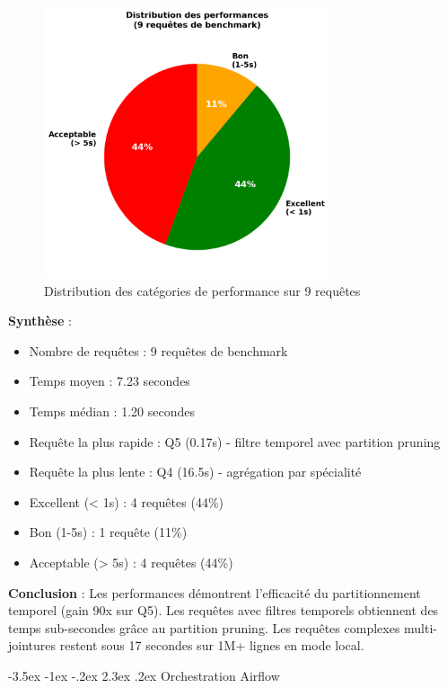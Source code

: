 \documentclass[12pt,a4paper]{article}
\makeatletter
\renewcommand\section{\@startsection{section}{1}{\z@}%
    {-3.5ex \@plus -1ex \@minus -.2ex}%
    {2.3ex \@plus.2ex}%
    {\normalfont\Large\bfseries\color{blue!70!black}}}
\makeatother
\begin{document}
\begin{figure}[H]
\centering
\includegraphics[width=0.75\textwidth]{performance_distribution.png}
\caption{Distribution des catégories de performance sur 9 requêtes}
\label{fig:perf_distribution}
\end{figure}

\textbf{Synthèse} :
\begin{itemize}
\item Nombre de requêtes : 9 requêtes de benchmark
\item Temps moyen : 7.23 secondes
\item Temps médian : 1.20 secondes
\item Requête la plus rapide : Q5 (0.17s) - filtre temporel avec partition pruning
\item Requête la plus lente : Q4 (16.5s) - agrégation par spécialité
\item Excellent (< 1s) : 4 requêtes (44\%)
\item Bon (1-5s) : 1 requête (11\%)
\item Acceptable (> 5s) : 4 requêtes (44\%)
\end{itemize}

\textbf{Conclusion} : Les performances démontrent l'efficacité du partitionnement temporel (gain 90x sur Q5). Les requêtes avec filtres temporels obtiennent des temps sub-secondes grâce au partition pruning. Les requêtes complexes multi-jointures restent sous 17 secondes sur 1M+ lignes en mode local.

\newpage
\section{Orchestration Airflow}
\end{document}
